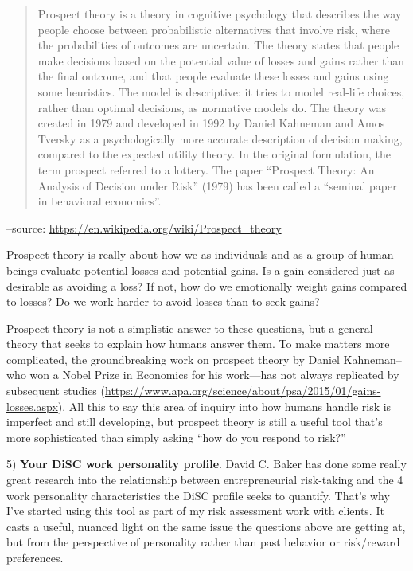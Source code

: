 \begin{quote}
Prospect theory is a theory in cognitive psychology that describes the way people choose between probabilistic alternatives that involve risk, where the probabilities of outcomes are uncertain. The theory states that people make decisions based on the potential value of losses and gains rather than the final outcome, and that people evaluate these losses and gains using some heuristics. The model is descriptive: it tries to model real-life choices, rather than optimal decisions, as normative models do. The theory was created in 1979 and developed in 1992 by Daniel Kahneman and Amos Tversky as a psychologically more accurate description of decision making, compared to the expected utility theory. In the original formulation, the term prospect referred to a lottery. The paper ``Prospect Theory: An Analysis of Decision under Risk'' (1979) has been called a ``seminal paper in behavioral economics''.
\end{quote}

--source: \href{https://en.wikipedia.org/wiki/Prospect_theory}{https://en.wikipedia.org/wiki/Prospect\_theory}

Prospect theory is really about how we as individuals and as a group of human beings evaluate potential losses and potential gains. Is a gain considered just as desirable as avoiding a loss? If not, how do we emotionally weight gains compared to losses? Do we work harder to avoid losses than to seek gains?

Prospect theory is not a simplistic answer to these questions, but a general theory that seeks to explain how humans answer them. To make matters more complicated, the groundbreaking work on prospect theory by Daniel Kahneman--who won a Nobel Prize in Economics for his work—has not always replicated by subsequent studies (\href{https://www.apa.org/science/about/psa/2015/01/gains-losses.aspx}{https://www.apa.org/science/about/psa/2015/01/gains-losses.aspx}). All this to say this area of inquiry into how humans handle risk is imperfect and still developing, but prospect theory is still a useful tool that's more sophisticated than simply asking ``how do you respond to risk?''

5) \textbf{Your DiSC work personality profile}. David C. Baker has done some really great research into the relationship between entrepreneurial risk-taking and the 4 work personality characteristics the DiSC profile seeks to quantify. That's why I've started using this tool as part of my risk assessment work with clients. It casts a useful, nuanced light on the same issue the questions above are getting at, but from the perspective of personality rather than past behavior or risk/reward preferences.

